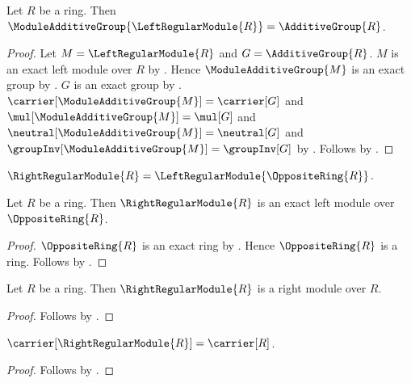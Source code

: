 \begin{theorem}\label{left_regular_module_additive_group}
    Let $R$ be a ring.
    Then
        $\ModuleAdditiveGroup{\LeftRegularModule{R}}
            =\AdditiveGroup{R}$.
\end{theorem}
\begin{proof}
    Let $M=\LeftRegularModule{R}$ and $G=\AdditiveGroup{R}$.
    $M$ is an exact left module over $R$ by
        .
    Hence $\ModuleAdditiveGroup{M}$ is an exact group by
        .
    $G$ is an exact group by
        .
    $\carrier[\ModuleAdditiveGroup{M}]=\carrier[G]$ and
        $\mul[\ModuleAdditiveGroup{M}]=\mul[G]$ and
        $\neutral[\ModuleAdditiveGroup{M}]=\neutral[G]$ and
        $\groupInv[\ModuleAdditiveGroup{M}]=\groupInv[G]$ by
        .
    Follows by .
\end{proof}

\begin{definition}\label{right_regular_module}
    $\RightRegularModule{R}=\LeftRegularModule{\OppositeRing{R}}$.
\end{definition}

\begin{theorem}\label{right_regular_module_is_exact}
    Let $R$ be a ring.
    Then $\RightRegularModule{R}$ is an exact left module over
        $\OppositeRing{R}$.
\end{theorem}
\begin{proof}
    $\OppositeRing{R}$ is an exact ring by
        .
    Hence $\OppositeRing{R}$ is a ring.
    Follows by
        .
\end{proof}

\begin{proposition}\label{right_regular_module_is_right_module}
    Let $R$ be a ring.
    Then $\RightRegularModule{R}$ is a right module over $R$.
\end{proposition}
\begin{proof}
    Follows by
        .
\end{proof}

\begin{proposition}\label{right_regular_module_carrier}
    $\carrier[\RightRegularModule{R}]=\carrier[R]$.
\end{proposition}
\begin{proof}
    Follows by
        .
\end{proof}

